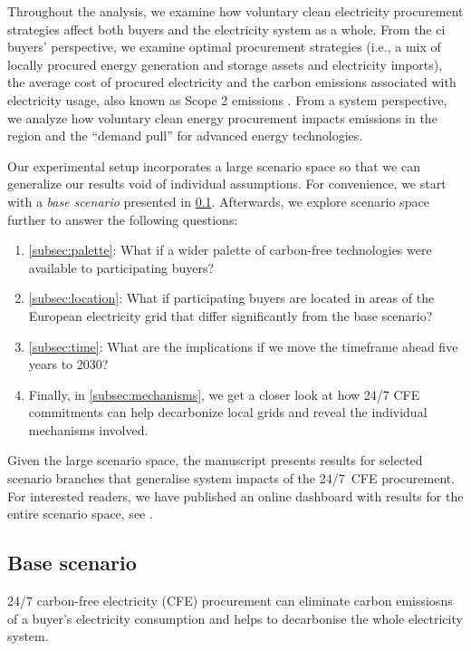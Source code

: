 Throughout the analysis, we examine how voluntary clean electricity procurement strategies affect both buyers and the electricity system as a whole.
From the \gls{ci} buyers' perspective, we examine optimal procurement strategies (i.e., a mix of locally procured energy generation and storage assets and electricity imports), the average cost of procured electricity and the carbon emissions associated with electricity usage, also known as Scope 2 emissions \cite{GHGProtocolScope2}.
From a system perspective, we analyze how voluntary clean energy procurement impacts \co emissions in the region and the \enquote{demand pull} for advanced energy technologies.

Our experimental setup incorporates a large scenario space so that we can generalize our results void of individual assumptions.
For convenience, we start with a \textit{base scenario} presented in \cref{subsec:base}.
Afterwards, we explore scenario space further to answer the following questions:

\begin{enumerate}[-]
\item \cref{subsec:palette}: What if a wider palette of carbon-free technologies were available to participating buyers?
\item \cref{subsec:location}: What if participating buyers are located in areas of the European electricity grid that differ significantly from the base scenario?
\item \cref{subsec:time}: What are the implications if we move the timeframe ahead five years to 2030?
\item Finally, in \cref{subsec:mechanisms}, we get a closer look at how 24/7 CFE commitments can help decarbonize local grids and reveal the individual mechanisms involved.
\end{enumerate}

Given the large scenario space, the manuscript presents results for selected scenario branches that generalise system impacts of the 24/7~CFE procurement.
For interested readers, we have published an online dashboard with results for the entire scenario space, see .

\subsection{Base scenario}
\label{subsec:base}

\vspace{10pt}
\begin{res}
    24/7 carbon-free electricity (CFE) procurement can eliminate carbon emissiosns of a buyer's electricity consumption and helps to decarbonise the whole electricity system.
\end{res}

